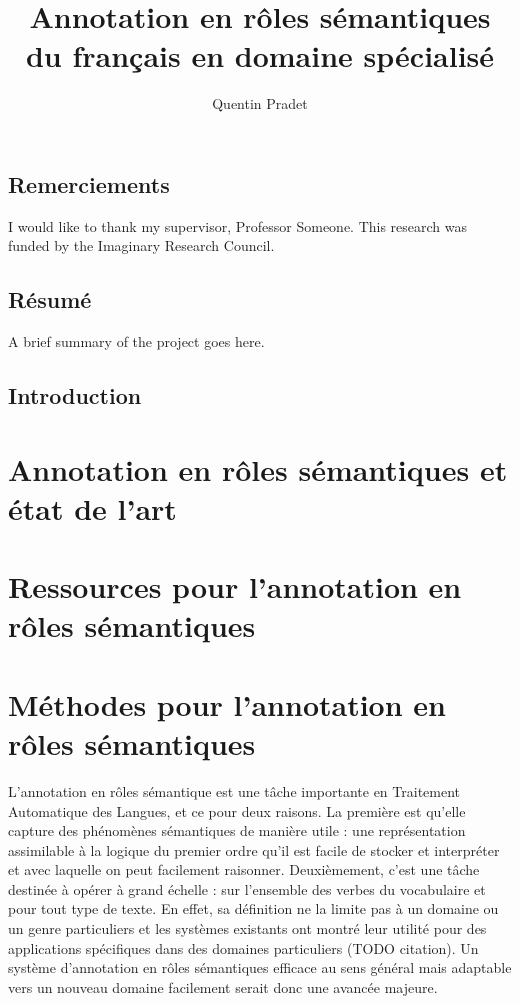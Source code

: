 \documentclass[oneside]{scrbook}
\title{Annotation en rôles sémantiques du français en domaine spécialisé}
\author{Quentin Pradet}
\date{}
\begin{document}
\maketitle

\frontmatter
\tableofcontents
\listoffigures
\listoftables

\chapter{Remerciements}

I would like to thank my supervisor, Professor Someone. This
research was funded by the Imaginary Research Council.

\chapter{Résumé}

A brief summary of the project goes here.


\mainmatter

\chapter{Introduction}
\label{ch:intro}

\part{Annotation en rôles sémantiques et état de l'art}





\part{Ressources pour l'annotation en rôles sémantiques}





\part{Méthodes pour l'annotation en rôles sémantiques}

L'annotation en rôles sémantique est une tâche importante en Traitement
Automatique des Langues, et ce pour deux raisons. La première est qu'elle
capture des phénomènes sémantiques de manière utile : une représentation
assimilable à la logique du premier ordre qu'il est facile de stocker et
interpréter et avec laquelle on peut facilement raisonner. Deuxièmement, c'est
une tâche destinée à opérer à grand échelle : sur l'ensemble des verbes du
vocabulaire et pour tout type de texte. En effet, sa définition ne la limite
pas à un domaine ou un genre particuliers et les systèmes existants ont montré
leur utilité pour des applications spécifiques dans des domaines particuliers
(TODO citation). Un système d'annotation en rôles sémantiques efficace au sens
général mais adaptable vers un nouveau domaine facilement serait donc une
avancée majeure.
\end{document}
